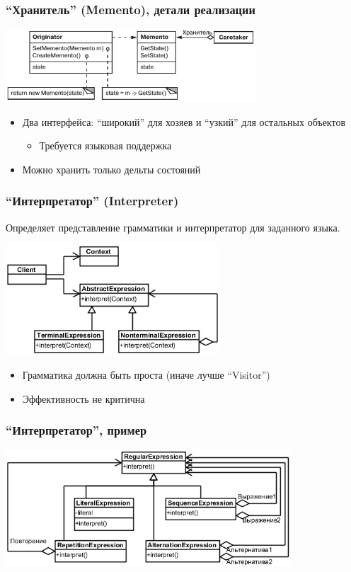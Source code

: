 \documentclass[xetex,mathserif,serif]{beamer}
\begin{document}
	\begin{frame}
		\frametitle{``Хранитель'' (Memento), детали реализации}
		\begin{center}
			\includegraphics[width=0.7\textwidth]{memento.png}
		\end{center}
		\begin{itemize}
			\item Два интерфейса: ``широкий'' для хозяев и ``узкий'' для остальных объектов
			\begin{itemize}
				\item Требуется языковая поддержка
			\end{itemize}
			\item Можно хранить только дельты состояний
		\end{itemize}
	\end{frame}

	\begin{frame}
		\frametitle{``Интерпретатор'' (Interpreter)}
		Определяет представление грамматики и интерпретатор для заданного языка.
		\begin{center}
			\includegraphics[width=0.6\textwidth]{interpreter.png}
		\end{center}
		\begin{itemize}
			\item Грамматика должна быть проста (иначе лучше ``Visitor'')
			\item Эффективность не критична
		\end{itemize}
	\end{frame}

	\begin{frame}
		\frametitle{``Интерпретатор'', пример}
		\begin{center}
			\includegraphics[width=0.8\textwidth]{regexp.png}
		\end{center}
	\end{frame}
\end{document}

